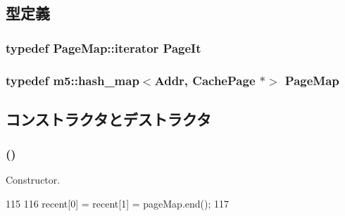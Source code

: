 \subsection{型定義}
\hypertarget{classDecodeCache_1_1AddrMap_af0021638c8ab5f47787c8c1973a125b8}{
\subsubsection[{PageIt}]{\setlength{\rightskip}{0pt plus 5cm}typedef PageMap::iterator {\bf PageIt}}}
\label{classDecodeCache_1_1AddrMap_af0021638c8ab5f47787c8c1973a125b8}
\hypertarget{classDecodeCache_1_1AddrMap_a975f1d72d35f5fb84de6f419b04bf347}{
\subsubsection[{PageMap}]{\setlength{\rightskip}{0pt plus 5cm}typedef m5::hash\_\-map$<${\bf Addr}, {\bf CachePage} $\ast$$>$ {\bf PageMap}}}
\label{classDecodeCache_1_1AddrMap_a975f1d72d35f5fb84de6f419b04bf347}


\subsection{コンストラクタとデストラクタ}
\hypertarget{classDecodeCache_1_1AddrMap_a3214943b0a8ea1081d074586e075edde}{
\subsubsection[{AddrMap}]{ ()}}
\label{classDecodeCache_1_1AddrMap_a3214943b0a8ea1081d074586e075edde}


Constructor. 


\begin{DoxyCode}
115     {
116         recent[0] = recent[1] = pageMap.end();
117     }
\end{DoxyCode}


